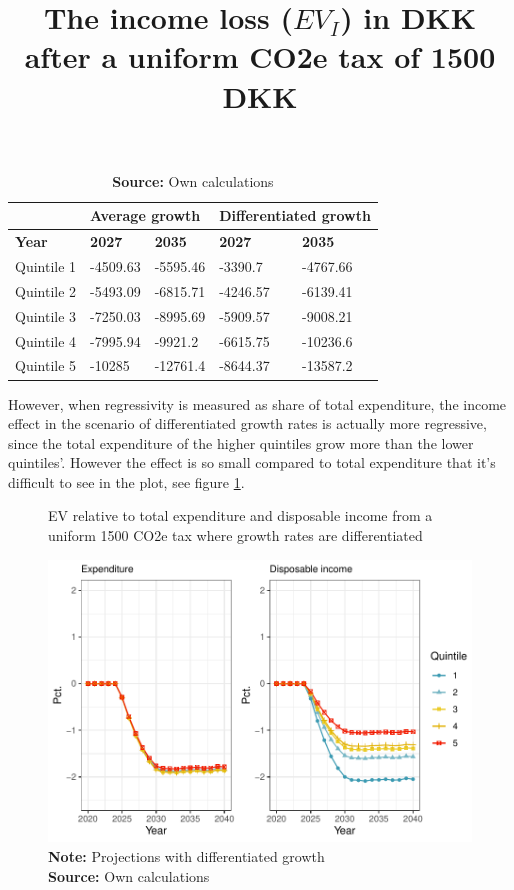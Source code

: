 \begin{table}[hhh]
\title{The income loss ($EV_I$) in DKK after a uniform CO2e tax of 1500 DKK}\label{tabel_EV_abs}
\centering
\begin{tabular}{@{}lllll@{}}
\toprule
 & \multicolumn{2}{l}{Average growth} & \multicolumn{2}{l}{Differentiated growth} \\ \midrule
\textbf{Year} & \textbf{2027} & \textbf{2035} & \textbf{2027} & \textbf{2035} \\
Quintile 1 & -4509.63 & -5595.46 & -3390.7 & -4767.66 \\
Quintile 2 & -5493.09 & -6815.71 & -4246.57 & -6139.41 \\
Quintile 3 & -7250.03 & -8995.69 & -5909.57 & -9008.21 \\
Quintile 4 & -7995.94 & -9921.2 & -6615.75 & -10236.6 \\
Quintile 5 & -10285 & -12761.4 & -8644.37 & -13587.2 \\ \bottomrule
\end{tabular}
\caption*{
\textbf{Source:} Own calculations}
\end{table}

However, when regressivity is measured as share of total expenditure, the income effect in the scenario of differentiated growth rates is actually more regressive, since the total expenditure of the higher quintiles grow more than the lower quintiles'. However the effect is so small compared to total expenditure that it's difficult to see in the plot, see figure \ref{EV_diff}.

\begin{figure}[H]
\centering
\caption{EV relative to total expenditure and disposable income from a uniform 1500 CO2e tax where growth rates are differentiated}
\label{EV_diff}
\includegraphics[width=.9\textwidth]{Figures/EV_plot_diff.pdf}
\captionsetup{singlelinecheck=off,size=scriptsize}
\setlength{\captionmargin}{10pt}
\caption*{
\textbf{Note:} Projections with differentiated growth\\
\textbf{Source:} Own calculations}
\end{figure}


